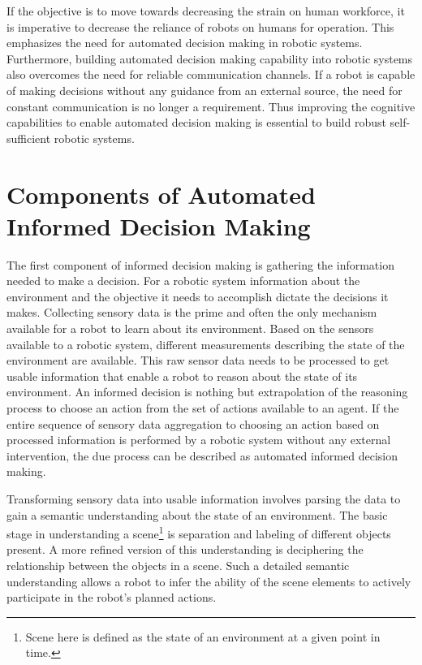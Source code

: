 If the objective is to move towards decreasing the strain on human workforce, it is imperative to decrease the reliance of robots on humans for operation. This emphasizes the need for automated decision making in robotic systems. Furthermore, building automated decision making capability into robotic systems also overcomes the need for reliable communication channels. If a robot is capable of making decisions without any guidance from an external source, the need for constant communication is no longer a requirement.
Thus improving the cognitive capabilities to enable automated decision making is essential to build robust self-sufficient robotic systems.

\section{Components of Automated Informed Decision Making}

The first component of informed decision making is gathering the information needed to make a decision. 
For a robotic system
information about the environment and the objective it needs to accomplish dictate the decisions it makes. 
Collecting sensory data is the prime 
and often the only mechanism available for a robot to learn about its environment. Based on the sensors available to a 
robotic system, different measurements describing the state of the environment are available. This raw sensor data needs to be processed to get usable information that enable a robot to reason about the state of its environment. 
An informed decision is 
nothing but extrapolation of the reasoning process to choose an action from the set of actions available to an agent.
If the entire sequence of sensory data aggregation to choosing an action based on processed information is performed by
a robotic system without any external intervention, the due process can be described as automated informed decision making. 

Transforming sensory data into usable information involves parsing the data to gain a semantic understanding about the state of an environment.
The basic stage in understanding a scene\footnote{Scene here is defined as the state of an environment at a given point in time.} is separation and labeling of different objects present.
A more refined version of this understanding is deciphering the relationship between the objects in a scene.
Such a detailed semantic understanding allows a robot to infer the ability of the scene elements 
to actively participate in the robot's planned actions.

